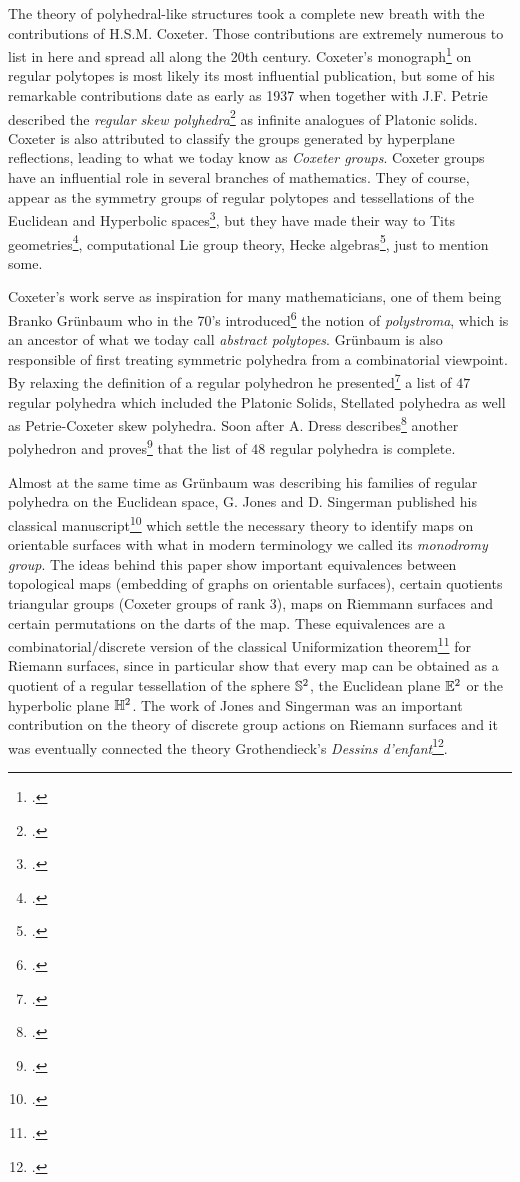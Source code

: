 The theory of polyhedral-like structures took a complete new breath with the contributions of H.S.M. Coxeter.
Those contributions are extremely numerous to list in here and spread all along the 20th century.
Coxeter's monograph\footcite{Coxeter_1973_RegularPolytopes} on regular polytopes is most likely its most influential publication, but some of his remarkable contributions date as early as 1937 when together with J.F. Petrie described the \emph{regular skew polyhedra}\footcite{Coxeter_1937_RegularSkewPolyhedra} as infinite analogues of Platonic solids.
Coxeter is also attributed to classify the groups generated by hyperplane reflections, leading to what we today know as \emph{Coxeter groups}.
Coxeter groups have an influential role in several branches of mathematics. They of course, appear as the symmetry groups of regular polytopes and tessellations of the Euclidean and Hyperbolic spaces\footcite{Humphreys_1990_ReflectionGroupsCoxeter}, but they have made their way to Tits geometries\footcite{Tits_1974_BuildingsSphericalType}, computational Lie group theory, Hecke algebras\footcite{Cohen_1991_CoxeterGroupsThree}, just to mention some.


Coxeter's work serve as inspiration for many mathematicians, one of them being Branko Grünbaum who in the 70's introduced\footcite{Gruenbaum_1978_RegularityGraphsComplexes} the notion of \emph{polystroma}, which is an ancestor of what we today call \emph{abstract polytopes}.
Grünbaum is also responsible of first treating symmetric polyhedra from a combinatorial viewpoint.
By relaxing the definition of a regular polyhedron he presented\footcite{Gruenbaum_1977_RegularPolyhedraOld} a list of $47$ regular polyhedra which included the Platonic Solids, Stellated polyhedra as well as Petrie-Coxeter skew polyhedra. Soon after A. Dress describes\footcite{Dress_1981_CombinatorialTheoryGrunbaums} another polyhedron and proves\footcite{Dress_1985_CombinatorialTheoryGrunbaums} that the list of $48$ regular polyhedra is complete.

Almost at the same time as Grünbaum was describing his families of regular polyhedra on the Euclidean space, G. Jones and D. Singerman published his classical manuscript\footcite{JonesSingerman_1978_TheoryMapsOrientable} which settle the necessary theory to identify maps on orientable surfaces with what in modern terminology we called its \emph{monodromy group}.
The ideas behind this paper show important equivalences between topological maps (embedding of graphs on orientable surfaces), certain quotients triangular groups (Coxeter groups of rank $3$), maps on Riemmann surfaces and certain permutations on the darts of the map.
These equivalences are a combinatorial/discrete version of the classical Uniformization theorem\footcite{Abikoff_1981_UniformizationTheorem} for Riemann surfaces, since in particular show that every map can be obtained as a quotient of a regular tessellation of the sphere $\mathbb{S}^{2}$, the Euclidean plane $\mathbb{E}^{2}$ or the hyperbolic plane $\mathbb{H}^{2}$.
The work of Jones and Singerman was an important contribution on the theory of discrete group actions on Riemann surfaces and it was eventually connected the theory Grothendieck's \emph{Dessins d'enfant}\footcite{JonesWolfart_2016_DessinsDenfantsRiemann}.

